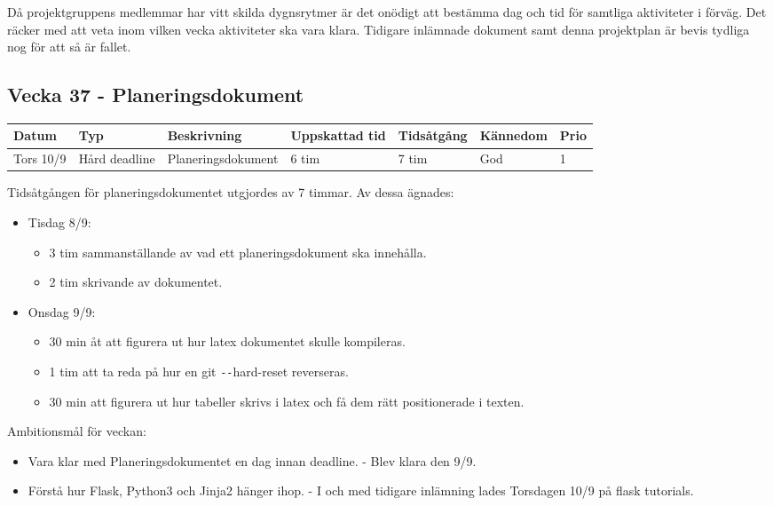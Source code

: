 \documentclass{TDP003mall}
\begin{document}
 Då projektgruppens medlemmar har vitt skilda dygnsrytmer är det onödigt att bestämma dag och tid för samtliga aktiviteter i förväg. Det räcker med att veta inom vilken vecka aktiviteter ska vara klara. Tidigare inlämnade dokument samt denna projektplan är bevis tydliga nog för att så är fallet.

 \subsection*{Vecka 37 - Planeringsdokument}
 
\begin{tabularx}{\linewidth}{|l|l|X|l|l|l|l|}
	\hline
	Datum & Typ           & Beskrivning        & Uppskattad tid & Tidsåtgång & Kännedom & Prio \\ [0.5ex]
	\hline                                             
	Tors 10/9  & Hård deadline & Planeringsdokument & 6 tim             & 7 tim         & God      & 1    \\
	\hline
\end{tabularx}

Tidsåtgången för planeringsdokumentet utgjordes av 7 timmar. Av dessa ägnades:
\begin{itemize}
	\item Tisdag 8/9:
	\begin{itemize}
		\item 3 tim sammanställande av vad ett planeringsdokument ska innehålla.
		\item 2 tim skrivande av dokumentet.
	\end{itemize}
	\item Onsdag 9/9:
	\begin{itemize}
		\item 30 min åt att figurera ut hur latex dokumentet skulle kompileras.
		\item 1 tim att ta reda på hur en git \texttt{-{}-}hard-reset reverseras.
		\item 30 min att figurera ut hur tabeller skrivs i latex och få dem rätt positionerade i texten.\\
	\end{itemize}

      \end{itemize}

      Ambitionsmål för veckan:
      \begin{itemize}
      \item Vara klar med Planeringsdokumentet en dag innan deadline. - Blev klara den 9/9.
      \item Förstå hur Flask, Python3 och Jinja2 hänger ihop. - I och med tidigare inlämning lades Torsdagen 10/9 på flask tutorials.
      \end{itemize}
      
\end{document}
